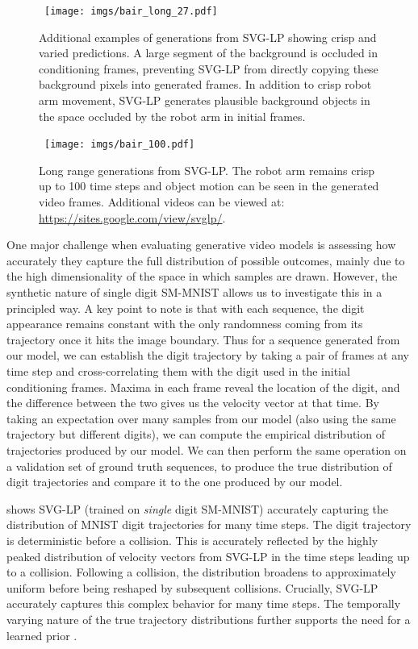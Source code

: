 \begin{figure*}[t!]
    \centering
\mbox{
  \texttt{[image: imgs/bair\_long\_27.pdf]}
 }
 \caption{Additional examples of generations from SVG-LP showing crisp and varied predictions. A large segment of the background is occluded in conditioning frames, preventing SVG-LP from directly copying these background pixels into generated frames. In addition to crisp robot arm movement, SVG-LP generates plausible background objects in the space occluded by the robot arm in initial frames. }
    \label{fig:bair_long}
\end{figure*}

\begin{figure*}[t!]
    \centering
\mbox{
  \texttt{[image: imgs/bair\_100.pdf]}
 }
 \caption{Long range generations from SVG-LP. The robot arm remains crisp up to 100 time steps and object motion can be seen in the generated video frames. Additional videos can be viewed at: \url{https://sites.google.com/view/svglp/}. }
\label{fig:bair_very_long}
\end{figure*}

One major challenge when evaluating generative video models is
assessing how accurately they capture the full distribution of
possible outcomes, mainly due to the high dimensionality of the space
in which samples are drawn. However, the synthetic nature of single digit SM-MNIST
allows us to investigate this in a principled way. 
A key point to note
is that with each sequence, the digit appearance remains constant with
the only randomness coming from its trajectory once it hits the image
boundary. Thus for a sequence generated from our model, we can
establish the digit trajectory by taking a pair of frames at any time
step and cross-correlating them with the digit used in the initial
conditioning frames. Maxima in each frame reveal the location of the
digit, and the difference between the two gives us the velocity vector
at that time.  By taking an expectation over many samples from our
model (also using the same trajectory but different digits), we can
compute the empirical distribution of trajectories produced by our
model. We can then perform the same operation on a validation set of
ground truth sequences, to produce the true distribution of digit
trajectories and compare it to the one produced by our model.


 shows SVG-LP (trained on {\em single} digit SM-MNIST) accurately capturing the distribution of MNIST digit trajectories for many time steps. 
The digit trajectory is deterministic before a collision.
This is accurately reflected by the highly peaked distribution of velocity vectors from SVG-LP in the time steps leading up to a collision.
Following a collision, the distribution broadens to approximately uniform before being reshaped by subsequent collisions.
Crucially, SVG-LP accurately captures this complex behavior for many time steps.
The temporally varying nature of the true trajectory distributions further supports the need for a learned prior .

